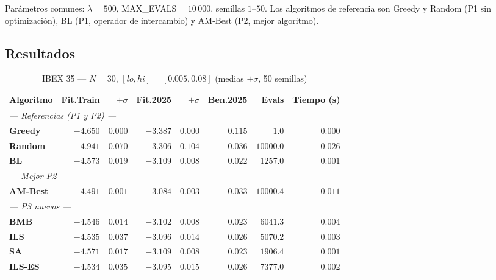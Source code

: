 \documentclass[12pt,a4paper]{article}
\begin{document}
Parámetros comunes: $\lambda=500$, MAX\_EVALS$=10\,000$, semillas $1$--$50$.
Los algoritmos de referencia son Greedy y Random (P1 sin optimización), BL (P1,
operador de intercambio) y AM-Best (P2, mejor algoritmo).

\subsection{Resultados}

\begin{table}[H]
\centering\footnotesize
\caption{IBEX 35 --- $N=30$, $[lo,hi]=[0.005,0.08]$ (medias $\pm\sigma$, 50 semillas)}
\begin{tabular}{lrrrrrr r}
\toprule
\textbf{Algoritmo} & \textbf{Fit.Train} & $\pm\sigma$ & \textbf{Fit.2025} & $\pm\sigma$ & \textbf{Ben.2025} & \textbf{Evals} & \textbf{Tiempo (s)} \\
\midrule
\multicolumn{8}{l}{\textit{--- Referencias (P1 y P2) ---}} \\
\textbf{Greedy}   & $-4.650$ & $0.000$ & $-3.387$ & $0.000$ & $0.115$ & $1.0$      & $0.000$ \\
\textbf{Random}   & $-4.941$ & $0.070$ & $-3.306$ & $0.104$ & $0.036$ & $10000.0$  & $0.026$ \\
\textbf{BL}       & $-4.573$ & $0.019$ & $-3.109$ & $0.008$ & $0.022$ & $1257.0$   & $0.001$ \\
\multicolumn{8}{l}{\textit{--- Mejor P2 ---}} \\
\textbf{AM-Best}  & $\mathbf{-4.491}$ & $0.001$ & $\mathbf{-3.084}$ & $0.003$ & $0.033$ & $10000.4$  & $0.011$ \\
\multicolumn{8}{l}{\textit{--- P3 nuevos ---}} \\
\textbf{BMB}      & $-4.546$ & $0.014$ & $-3.102$ & $0.008$ & $0.023$ & $6041.3$   & $0.004$ \\
\textbf{ILS}      & $-4.535$ & $0.037$ & $-3.096$ & $0.014$ & $0.026$ & $5070.2$   & $0.003$ \\
\textbf{SA}       & $-4.571$ & $0.017$ & $-3.109$ & $0.008$ & $0.023$ & $1906.4$   & $0.001$ \\
\textbf{ILS-ES}   & $\mathbf{-4.534}$ & $0.035$ & $\mathbf{-3.095}$ & $0.015$ & $0.026$ & $7377.0$   & $0.002$ \\
\bottomrule
\end{tabular}
\end{table}
\end{document}

